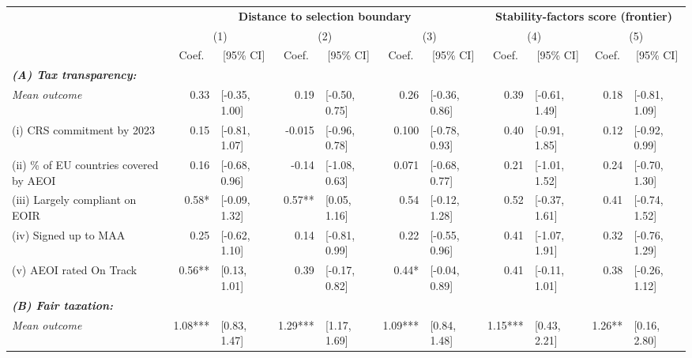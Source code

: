 \begin{adjustbox}{max width=\textwidth}
\begin{tabular}{l*{5}{r@{\hspace{3pt}}l}}
\toprule
&\multicolumn{6}{c}{{\bf Distance to selection boundary}}&\multicolumn{4}{c}{{\bf Stability-factors score (frontier)}}\\
\cmidrule(lr){2-7}
\cmidrule(lr){8-11}
&\multicolumn{2}{c}{(1)}&\multicolumn{2}{c}{(2)}&\multicolumn{2}{c}{(3)}&\multicolumn{2}{c}{(4)}&\multicolumn{2}{c}{(5)}\\
&\multicolumn{1}{c}{Coef.}&\multicolumn{1}{c}{[95\% CI]}&\multicolumn{1}{c}{Coef.}&\multicolumn{1}{c}{[95\% CI]}&\multicolumn{1}{c}{Coef.}&\multicolumn{1}{c}{[95\% CI]}&\multicolumn{1}{c}{Coef.}&\multicolumn{1}{c}{[95\% CI]}&\multicolumn{1}{c}{Coef.}&\multicolumn{1}{c}{[95\% CI]}\\
\midrule
\emph{{\bf (A) Tax transparency: }}&&&&&&&&&&\\
\hspace{.3cm} \emph{Mean outcome}& 0.33 & [-0.35, 1.00] & 0.19 & [-0.50, 0.75] & 0.26 & [-0.36, 0.86] & 0.39 & [-0.61, 1.49] & 0.18 & [-0.81, 1.09] \\
\hspace{.4cm} (i) CRS commitment by 2023& 0.15 & [-0.81, 1.07] & -0.015 & [-0.96, 0.78] & 0.100 & [-0.78, 0.93] & 0.40 & [-0.91, 1.85] & 0.12 & [-0.92, 0.99] \\
\hspace{.4cm} (ii) \% of EU countries covered by AEOI& 0.16 & [-0.68, 0.96] & -0.14 & [-1.08, 0.63] & 0.071 & [-0.68, 0.77] & 0.21 & [-1.01, 1.52] & 0.24 & [-0.70, 1.30] \\
\hspace{.4cm} (iii) Largely compliant on EOIR& 0.58* & [-0.09, 1.32] & 0.57** & [0.05, 1.16] & 0.54 & [-0.12, 1.28] & 0.52 & [-0.37, 1.61] & 0.41 & [-0.74, 1.52] \\
\hspace{.4cm} (iv) Signed up to MAA& 0.25 & [-0.62, 1.10] & 0.14 & [-0.81, 0.99] & 0.22 & [-0.55, 0.96] & 0.41 & [-1.07, 1.91] & 0.32 & [-0.76, 1.29] \\
\hspace{.4cm} (v) AEOI rated On Track& 0.56** & [0.13, 1.01] & 0.39 & [-0.17, 0.82] & 0.44* & [-0.04, 0.89] & 0.41 & [-0.11, 1.01] & 0.38 & [-0.26, 1.12] \\
\midrule \emph{{\bf (B) Fair taxation: }}&&&&&&&&&&\\
\hspace{.3cm} \emph{Mean outcome}& 1.08*** & [0.83, 1.47] & 1.29*** & [1.17, 1.69] & 1.09*** & [0.84, 1.48] & 1.15*** & [0.43, 2.21] & 1.26** & [0.16, 2.80] \\

\end{tabular}
\end{adjustbox}

